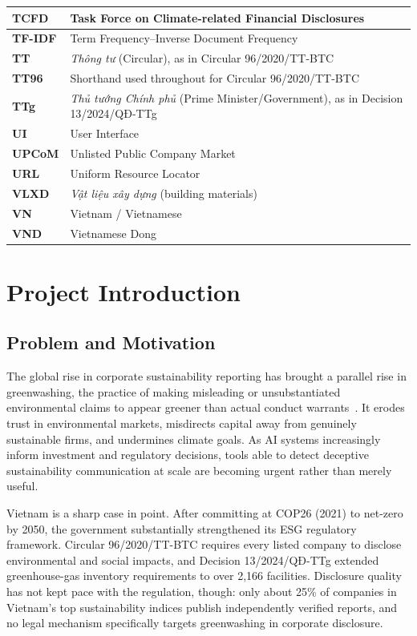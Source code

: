 \documentclass[fontsize=12pt,oneside,headings=small]{scrreprt}
\begin{document}
\begin{center}
\begin{longtable}{|>{\bfseries}p{2.6cm}|p{12.4cm}|}
TCFD & Task Force on Climate-related Financial Disclosures \\ \hline
TF-IDF & Term Frequency--Inverse Document Frequency \\ \hline
TT & \textit{Thông tư} (Circular), as in Circular 96/2020/TT-BTC \\ \hline
TT96 & Shorthand used throughout for Circular 96/2020/TT-BTC \\ \hline
TTg & \textit{Thủ tướng Chính phủ} (Prime Minister/Government), as in Decision 13/2024/QĐ-TTg \\ \hline
UI & User Interface \\ \hline
UPCoM & Unlisted Public Company Market \\ \hline
URL & Uniform Resource Locator \\ \hline
VLXD & \textit{Vật liệu xây dựng} (building materials) \\ \hline
VN & Vietnam / Vietnamese \\ \hline
VND & Vietnamese Dong \\ \hline
\end{longtable}
\addtocounter{table}{-1}
\end{center}
\endgroup

\clearpage
{}

\chapter{Project Introduction}
\section{Problem and Motivation}

The global rise in corporate sustainability reporting has brought a parallel rise in greenwashing, the practice of making misleading or unsubstantiated environmental claims to appear greener than actual conduct warrants~\cite{lyon2011greenwash}. It erodes trust in environmental markets, misdirects capital away from genuinely sustainable firms, and undermines climate goals. As AI systems increasingly inform investment and regulatory decisions, tools able to detect deceptive sustainability communication at scale are becoming urgent rather than merely useful.

Vietnam is a sharp case in point. After committing at COP26 (2021) to net-zero by 2050, the government substantially strengthened its ESG regulatory framework. Circular 96/2020/TT-BTC requires every listed company to disclose environmental and social impacts, and Decision 13/2024/QĐ-TTg extended greenhouse-gas inventory requirements to over 2{,}166 facilities. Disclosure quality has not kept pace with the regulation, though: only about 25\% of companies in Vietnam's top sustainability indices publish independently verified reports, and no legal mechanism specifically targets greenwashing in corporate disclosure.
\end{document}
